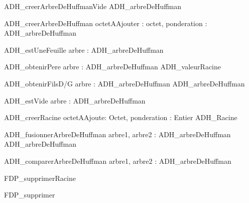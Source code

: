  
\begin{algorithme}

\signaturefonction 
{ADH\_creerArbreDeHuffmanVide}
{}
{ADH\_arbreDeHuffman}

\signaturefonction 
{ADH\_creerArbreDeHuffman}
{octetAAjouter : octet, ponderation : \naturel}
{ADH\_arbreDeHuffman}

\signaturefonction 
{ADH\_estUneFeuille}
{arbre : ADH\_arbreDeHuffman}
{\booleen}

\signaturefonction 
{ADH\_obtenirPere}
{arbre : ADH\_arbreDeHuffman}
{ADH\_valeurRacine}

\signaturefonction 
{ADH\_obtenirFilsD/G}
{arbre : ADH\_arbreDeHuffman}
{ADH\_arbreDeHuffman}

\signaturefonction 
{ADH\_estVide}
{arbre : ADH\_arbreDeHuffman}
{\booleen}

\signaturefonction 
{ADH\_creerRacine}
{octetAAjoute: Octet, ponderation : Entier}
{ADH\_Racine}

\signaturefonction 
{ADH\_fusionnerArbreDeHuffman}
{arbre1, arbre2 : ADH\_arbreDeHuffman}
{ADH\_arbreDeHuffman}

\signaturefonction 
{ADH\_comparerArbreDeHuffman}
{arbre1, arbre2 : ADH\_arbreDeHuffman}
{\booleen}

\signatureProcedure
{FDP\_supprimerRacine}
{}

\signatureProcedure
{FDP\_supprimer}
{}
\end{algorithme}
